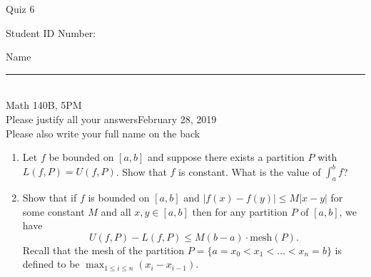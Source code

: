 \documentclass[12pt]{article}
\begin{document}
\begin{flushleft} 
\centerline{\LARGE{Quiz 6}} 
\vspace{5 mm}
{Student ID Number:}\hfill  
{Name \rule {2 in}{0.01in}}\\
Math 140B, 5PM
\\
{Please justify all your answers}\hfill {February 28, 2019}
\\
{Please also write your full name on the back} 

\medskip
\end{flushleft}


\begin{enumerate}
	\item Let $f$ be bounded on $[a,b]$ and suppose there exists a partition $P$ with $L(f, P) = U(f, P)$. Show that $f$ is constant. What is the value of $\int_a^bf$?
	\vfill
	\item Show that if $f$ is bounded on $[a,b]$ and $|f(x)-f(y)|\leq M|x-y|$ for some constant $M$ and all $x,y\in [a,b]$ then for any partition $P$ of $[a,b]$, we have
	$$U(f, P) - L(f,P) \leq M(b-a)\cdot \text{mesh}(P).$$
	Recall that the mesh of the partition $P = \{a=x_0<x_1<\ldots < x_n = b\}$ is defined to be $\max_{1\leq i\leq n}(x_i - x_{i-1})$.
	\vfill
\end{enumerate}


\end{document}

